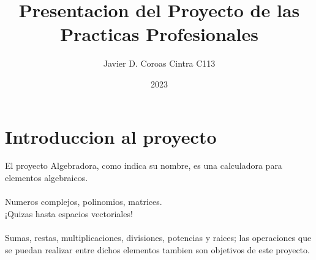 \documentclass{article}
\title{Presentacion del Proyecto de las Practicas Profesionales}
\author{Javier D. Coroas Cintra C113}
\date{2023}
\begin{document}
\maketitle

\newpage

\tableofcontents

\newpage

\section{Introduccion al proyecto}
El proyecto Algebradora, como indica su nombre, es una calculadora para elementos algebraicos.\\\\
Numeros complejos, polinomios, matrices.\\¡Quizas hasta espacios vectoriales!\\\\
Sumas, restas, multiplicaciones, divisiones, potencias y raices; las operaciones que se puedan realizar entre dichos elementos tambien son objetivos de este proyecto.

\newpage
\end{document}
